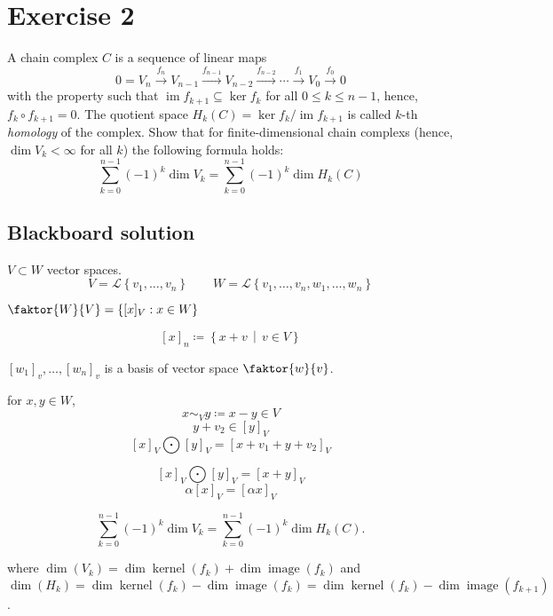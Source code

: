 \documentclass[a4paper]{article}
\theoremstyle{definition}
\DeclareMathOperator\kernel{kernel}
\DeclareMathOperator\image{image}
\newcommand\set[1]{\left\{#1\right\}}
\newcommand\setdef[2]{\left\{#1\,\middle|\,#2\right\}}
\begin{document}
\section{Exercise 2}
\begin{ex}
  A chain complex $C$ is a sequence of linear maps
  \[ 0 = V_n \xrightarrow{f_n} V_{n-1} \xrightarrow{f_{n-1}} V_{n-2} \xrightarrow{f_{n-2}} \cdots \xrightarrow{f_1} V_0 \xrightarrow{f_0} 0 \]
  with the property such that $\operatorname{im}{f_{k+1}} \subseteq \operatorname{ker}{f_{k}}$ for all $0 \leq k \leq n-1$, hence,
  $f_k \circ f_{k+1} = 0$. The quotient space $H_k(C) = \operatorname{ker}{f_k} / \operatorname{im}{f_{k+1}}$ is called $k$-th \emph{homology}
  of the complex. Show that for finite-dimensional chain complexs (hence, $\dim{V_k} < \infty$ for all $k$) the following formula holds:
  \[ \sum_{k=0}^{n-1} (-1)^k \dim{V_k} = \sum_{k=0}^{n-1} (-1)^k \dim{H_k}(C) \]
\end{ex}

\subsection{Blackboard solution}

$V \subset W$ vector spaces.
\[ V = \mathcal L\set{v_1, \dots, v_n} \qquad W = \mathcal L\set{v_1, \dots, v_n, w_1, \dots, w_n} \]

$\faktor{W}{V} = \set{[x]_V: x \in W}$

\[ [x]_n \coloneqq \setdef{x+v}{v \in V} \]

$[w_1]_v, \dots, [w_n]_v$ is a basis of vector space $\faktor{w}{v}$.

for $x, y \in W$,
\[ x \sim_V y \coloneqq x - y \in V \]
\[ y + v_2 \in [y]_V \]
\[ [x]_V \bigodot [y]_V = [x + v_1 + y + v_2]_V \]

\[ [x]_V \bigodot [y]_V = [x+y]_V \]
\[ \alpha [x]_V = [\alpha x]_V \]


\[ \sum_{k=0}^{n-1} (-1)^k \dim{V_k} = \sum_{k=0}^{n-1} (-1)^k \dim{H_k(C)}. \]

where $\dim(V_k) = \dim\kernel(f_k) + \dim\image(f_k)$ and $\dim(H_k) = \dim\kernel(f_k) - \dim\image(f_k) = \dim\kernel(f_k) - \dim\image(f_{k+1})$.
\end{document}
